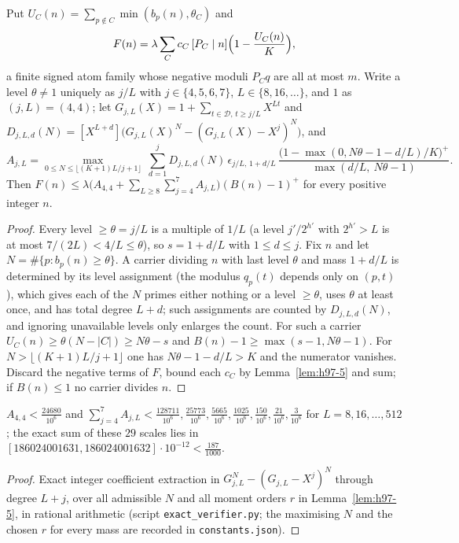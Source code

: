 \begin{lemma}\label{lem:h97-6}
Put $U_C(n)=\sum_{p\notin C}\min(b_p(n),\theta_C)$ and
\[
F(n)=\lambda\sum_Cc_C\,[P_C\mid n]\Bigl(1-\frac{U_C(n)}K\Bigr),
\]
a finite signed atom family whose negative moduli $P_Cq$ are all at most $m$. Write a level $\theta\ne1$ uniquely as
$j/L$ with $j\in\{4,5,6,7\}$, $L\in\{8,16,\dots\}$, and $1$ as $(j,L)=(4,4)$; let
$G_{j,L}(X)=1+\sum_{t\in\mathcal D,\,t\ge j/L}X^{Lt}$ and $D_{j,L,d}(N)=[X^{L+d}]\bigl(G_{j,L}(X)^N-(G_{j,L}(X)-X^j)^N\bigr)$,
and
\[
A_{j,L}=\max_{0\le N\le\lfloor(K+1)L/j+1\rfloor}\ \sum_{d=1}^{j}D_{j,L,d}(N)\,\epsilon_{j/L,\,1+d/L}\,
\frac{\bigl(1-\max(0,N\theta-1-d/L)/K\bigr)^+}{\max(d/L,\ N\theta-1)} .
\]
Then $F(n)\le\lambda\bigl(A_{4,4}+\sum_{L\ge8}\sum_{j=4}^7A_{j,L}\bigr)(B(n)-1)^+$ for every positive integer $n$.
\end{lemma}
\begin{proof}
Every level $\ge\theta=j/L$ is a multiple of $1/L$ (a level $j'/2^{h'}$ with $2^{h'}>L$ is at most
$7/(2L)<4/L\le\theta$), so $s=1+d/L$ with $1\le d\le j$. Fix $n$ and let $N=\#\{p:b_p(n)\ge\theta\}$. A carrier
dividing $n$ with last level $\theta$ and mass $1+d/L$ is determined by its level assignment (the modulus $q_p(t)$
depends only on $(p,t)$), which gives each of the $N$ primes either nothing or a level $\ge\theta$, uses $\theta$ at
least once, and has total degree $L+d$; such assignments are counted by $D_{j,L,d}(N)$, and ignoring unavailable
levels only enlarges the count. For such a carrier $U_C(n)\ge\theta(N-|C|)\ge N\theta-s$ and
$B(n)-1\ge\max(s-1,N\theta-1)$. For $N>\lfloor(K+1)L/j+1\rfloor$ one has $N\theta-1-d/L>K$ and the numerator vanishes.
Discard the negative terms of $F$, bound each $c_C$ by Lemma~\ref{lem:h97-5} and sum; if $B(n)\le1$ no carrier
divides $n$.
\end{proof}

\begin{lemma}\label{lem:h97-7}
$A_{4,4}<\tfrac{24680}{10^6}$ and $\sum_{j=4}^7A_{j,L}<\tfrac{128711}{10^6},\tfrac{25773}{10^6},\tfrac{5665}{10^6},
\tfrac{1025}{10^6},\tfrac{150}{10^6},\tfrac{21}{10^6},\tfrac3{10^6}$ for $L=8,16,\dots,512$; the exact sum of these
$29$ scales lies in $[186024001631,186024001632]\cdot10^{-12}<\tfrac{187}{1000}$.
\end{lemma}
\begin{proof}
Exact integer coefficient extraction in $G_{j,L}^N-(G_{j,L}-X^j)^N$ through degree $L+j$, over all admissible $N$ and
all moment orders $r$ in Lemma~\ref{lem:h97-5}, in rational arithmetic (script \texttt{exact\_verifier.py}; the
maximising $N$ and the chosen $r$ for every mass are recorded in \texttt{constants.json}).
\end{proof}

